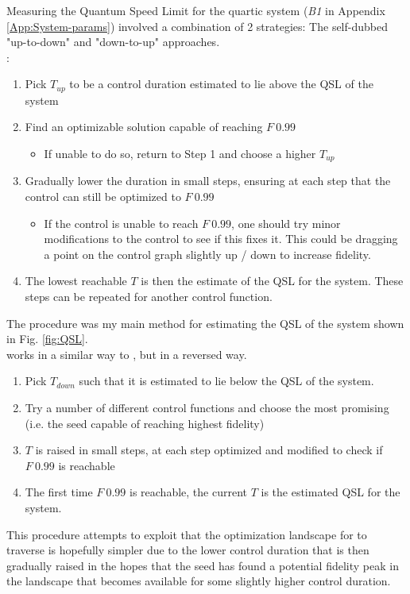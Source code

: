 \documentclass[a4paper, twocolumn]{revtex4-1}
\begin{document}
Measuring the Quantum Speed Limit for the quartic system (\textit{B1} in Appendix \ref{App:System-params}) involved a combination of 2 strategies: The self-dubbed "up-to-down" and "down-to-up" approaches. \\

:
\begin{enumerate}
	\item Pick $T_{up}$ to be a control duration estimated to lie above the QSL of the system
	\item Find an optimizable solution capable of reaching $F~0.99$
	\begin{itemize}
		\item If unable to do so, return to Step 1 and choose a higher $T_{up}$
	\end{itemize}
	\item Gradually lower the duration in small steps, ensuring at each step that the control can still be optimized to $F~0.99$
	\begin{itemize}
		\item If the control is unable to reach $F~0.99$, one should try minor modifications to the control to see if this fixes it. This could be dragging a point on the control graph slightly up / down to increase fidelity.
	\end{itemize}
	\item The lowest reachable $T$ is then the estimate of the QSL for the system. These steps can be repeated for another control function.
\end{enumerate}
The  procedure was my main method for estimating the QSL of the system shown in Fig. \ref{fig:QSL}.\\

 works in a similar way to , but in a reversed way.
\begin{enumerate}
	\item Pick $T_{down}$ such that it is estimated to lie below the QSL of the system.
	\item Try a number of different control functions and choose the most promising (i.e. the seed capable of reaching highest fidelity)
	\item $T$ is raised in small steps, at each step optimized and modified to check if $F~0.99$ is reachable
	\item The first time $F~0.99$ is reachable, the current $T$ is the estimated QSL for the system.
\end{enumerate}
This procedure attempts to exploit that the optimization landscape for  to traverse is hopefully simpler due to the lower control duration that is then gradually raised in the hopes that the seed has found a potential fidelity peak in the landscape that becomes available for some slightly higher control duration.
\end{document}
